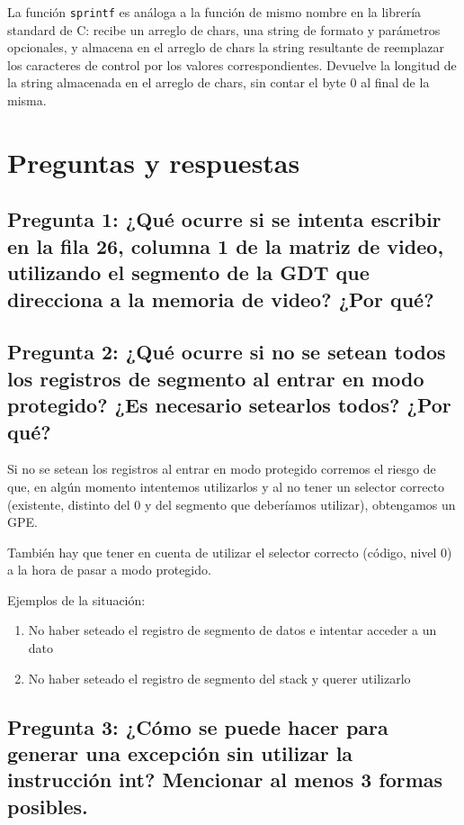 \documentclass[a4paper,10pt,twoside]{article}
\begin{document}
La función \texttt{sprintf} es análoga a la función de mismo nombre en la librería standard de C: recibe un arreglo de chars, una string de formato y parámetros opcionales, y almacena en el arreglo de chars la string resultante de reemplazar los caracteres de control por los valores correspondientes. Devuelve la longitud de la string almacenada en el arreglo de chars, sin contar el byte 0 al final de la misma.




\section{Preguntas y respuestas}


\subsection{Pregunta 1: ¿Qué ocurre si se intenta escribir en la fila 26, columna 1 de la matriz de video, utilizando el segmento de la GDT que direcciona a la memoria de video? ¿Por qué?}


\subsection{Pregunta 2: ¿Qué ocurre si no se setean todos los registros de segmento al entrar en
modo protegido? ¿Es necesario setearlos todos? ¿Por qué?}
Si no se setean los registros al entrar en modo protegido corremos el riesgo de que, en algún momento intentemos utilizarlos y al no tener un selector correcto (existente, distinto del 0 y del segmento que deberíamos utilizar), obtengamos un GPE.

También hay que tener en cuenta de utilizar el selector correcto (código, nivel 0) a la hora de pasar a modo protegido.

Ejemplos de la situación:

\begin{enumerate}
	\item No haber seteado el registro de segmento de datos e intentar acceder a un dato
	\item No haber seteado el registro de segmento del stack y querer utilizarlo
\end{enumerate}


\subsection{Pregunta 3: ¿Cómo se puede hacer para generar una excepción sin utilizar la instrucción int? Mencionar al menos 3 formas posibles.}
\end{document}
